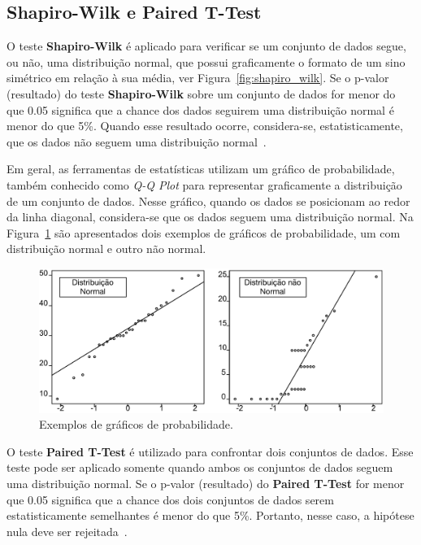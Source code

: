 \subsection{Shapiro-Wilk e Paired T-Test}\label{sec:shapiro_wilk}

O teste \textbf{Shapiro-Wilk} é aplicado para verificar se um conjunto de dados segue, ou não, uma distribuição normal, que possui graficamente o formato de um sino simétrico em relação à sua média, ver Figura~\ref{fig:shapiro_wilk}. Se o p-valor (resultado) do teste \textbf{Shapiro-Wilk} sobre um conjunto de dados for menor do que 0.05 significa que a chance dos dados seguirem uma distribuição normal é menor do que 5\%. Quando esse resultado ocorre, considera-se, estatisticamente, que os dados não seguem uma distribuição normal~\cite{Wohlin}. 


Em geral, as ferramentas de estatísticas utilizam um gráfico de probabilidade, também conhecido como \textit{Q-Q Plot} para representar graficamente a distribuição de um conjunto de dados. Nesse gráfico, quando os dados se posicionam ao redor da linha diagonal, considera-se que os dados seguem uma distribuição normal. Na Figura~\ref{fig:qq_plot_exemple} são apresentados dois exemplos de gráficos de probabilidade, um com distribuição normal e outro não normal.

\begin{figure}[h]
	\centering
	\caption{Exemplos de gráficos de probabilidade.}
	\label{fig:qq_plot_exemple}
	\includegraphics[scale=0.7]{images/qq_plot_exemplo}
	\fautor
\end{figure}

O teste \textbf{Paired T-Test} é utilizado para confrontar dois conjuntos de dados. Esse teste pode ser aplicado somente quando ambos os conjuntos de dados seguem uma distribuição normal. Se o p-valor (resultado) do \textbf{Paired T-Test} for menor que 0.05 significa que a chance dos dois conjuntos de dados serem estatisticamente semelhantes é menor do que 5\%. Portanto, nesse caso, a hipótese nula deve ser rejeitada~\cite{Wohlin}.

